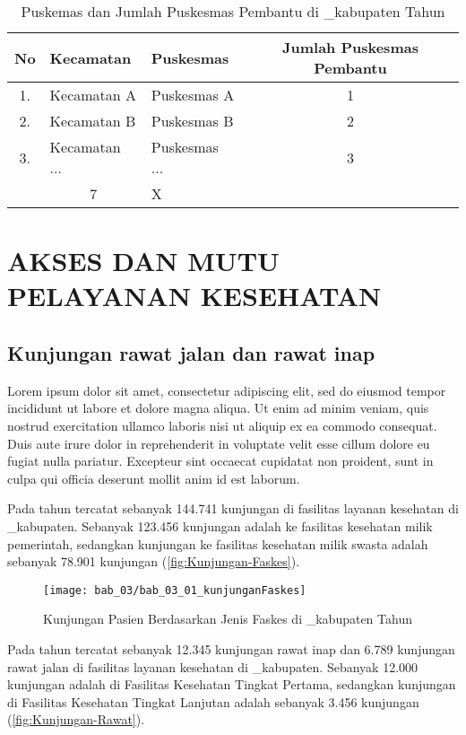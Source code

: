 \begin{table}[!ht]
\caption{Puskemas dan Jumlah Puskesmas Pembantu di \nama_kabupaten Tahun \tP}
\label{tab:Puskemas-dan-Pustu}
\centering{}%

\begin{tabular}{cllc}
\toprule
No & Kecamatan & \multicolumn{1}{l}{Puskesmas} & Jumlah Puskesmas Pembantu\\
\midrule
1. & Kecamatan A & Puskesmas A & 1\\
\rowcolor{black!20}2. & Kecamatan B & Puskesmas B & 2\\
3. & Kecamatan ... & Puskesmas ... & 3\\
\midrule
\rowcolor{blue!20}\multicolumn{2}{c}{Jumlah} & \multicolumn{1}{c}{7} & X\\
\bottomrule
\end{tabular}
\end{table}

\section{AKSES DAN MUTU PELAYANAN KESEHATAN}
\subsection{Kunjungan rawat jalan dan rawat inap}
Lorem ipsum dolor sit amet, consectetur adipiscing elit, sed do eiusmod tempor incididunt ut labore et dolore magna aliqua. Ut enim ad minim veniam, quis nostrud exercitation ullamco laboris nisi ut aliquip ex ea commodo consequat. Duis aute irure dolor in reprehenderit in voluptate velit esse cillum dolore eu fugiat nulla pariatur. Excepteur sint occaecat cupidatat non proident, sunt in culpa qui officia deserunt mollit anim id est laborum.

Pada tahun \tP tercatat sebanyak 144.741 kunjungan di fasilitas layanan kesehatan di \nama_kabupaten. Sebanyak 123.456 kunjungan adalah ke fasilitas kesehatan milik pemerintah, sedangkan kunjungan ke fasilitas kesehatan milik swasta adalah sebanyak 78.901 kunjungan (\autoref{fig:Kunjungan-Faskes}).

\begin{figure}[H]
    \centering{}
    \texttt{[image: bab\_03/bab\_03\_01\_kunjunganFaskes]}
    \caption{Kunjungan Pasien Berdasarkan Jenis Faskes di \nama_kabupaten Tahun \tP}
    \label{fig:Kunjungan-Faskes}
\end{figure}

Pada tahun \tP tercatat sebanyak 12.345 kunjungan rawat inap dan 6.789 kunjungan rawat jalan di fasilitas layanan kesehatan di \nama_kabupaten. Sebanyak 12.000 kunjungan adalah di Fasilitas Kesehatan Tingkat Pertama, sedangkan kunjungan di Fasilitas Kesehatan Tingkat Lanjutan adalah sebanyak 3.456 kunjungan (\autoref{fig:Kunjungan-Rawat}).

